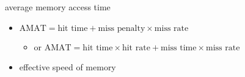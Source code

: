 \begin{frame}{average memory access time}
    \begin{itemize}
    \item $\text{AMAT} = \text{hit time} + \text{miss penalty} \times \text{miss rate}$
        \begin{itemize}
        \item or $\text{AMAT} = \text{hit time} \times \text{hit rate} + \text{miss time} \times \text{miss rate}$
        \end{itemize}
    \item effective speed of memory
    \end{itemize}
\end{frame}
